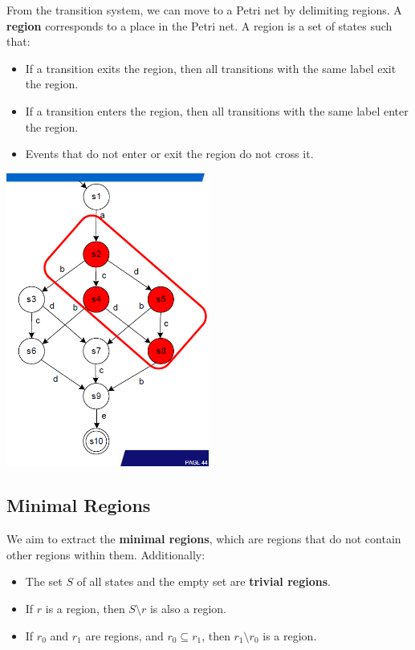 From the transition system, we can move to a Petri net by delimiting regions. A \textbf{region} corresponds to a place in the Petri net. A region is a set of states such that:
\begin{itemize}
    \item If a transition exits the region, then all transitions with the same label exit the region.
    \item If a transition enters the region, then all transitions with the same label enter the region.
    \item Events that do not enter or exit the region do not cross it.
\end{itemize}

\begin{center}
    \includegraphics[width=0.5\textwidth]{capitolo 6/6 region 1.png} %
\end{center}

\subsection{Minimal Regions}
We aim to extract the \textbf{minimal regions}, which are regions that do not contain other regions within them. Additionally:
\begin{itemize}
    \item The set \(S\) of all states and the empty set are \textbf{trivial regions}.
    \item If \(r\) is a region, then \(S \setminus r\) is also a region.
    \item If \(r_0\) and \(r_1\) are regions, and \(r_0 \subseteq r_1\), then \(r_1 \setminus r_0\) is a region.
\end{itemize}

